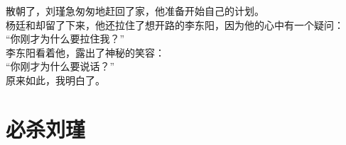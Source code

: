 \begin{multicols}{\theparacolNo}
散朝了，刘瑾急匆匆地赶回了家，他准备开始自己的计划。\\

杨廷和却留了下来，他还拉住了想开路的李东阳，因为他的心中有一个疑问：\\

“你刚才为什么要拉住我？”\\

李东阳看着他，露出了神秘的笑容：\\

“你刚才为什么要说话？”\\

原来如此，我明白了。\\
\ifnum{}
	\end{multicols}
\fi
\newpage
\section{必杀刘瑾}
\ifnum{}
